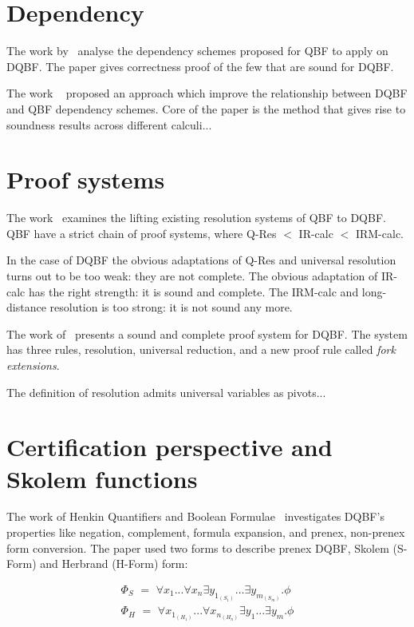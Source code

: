 \documentclass{article}
\begin{document}
\section{Dependency}
The work by~\cite{wimmer2016dependency} analyse the dependency
schemes proposed for QBF to apply on DQBF. 
%
The paper gives correctness proof of the few that are sound for DQBF. 
%

The work ~\cite{beyersdorff2018reinterpreting} proposed an approach which improve the relationship between DQBF and QBF
dependency schemes.
%
Core of the paper is the method that gives rise to soundness results across different calculi... 

\section{Proof systems}
The work~\cite{beyersdorff2016lifting} examines the lifting existing resolution systems of QBF to DQBF.
%
QBF have a strict chain of proof systems, where Q-Res $<$ IR-calc $<$ IRM-calc.
%

In the case of DQBF the obvious adaptations of Q-Res and universal resolution turns out to be too weak: they are not complete. 
%
The obvious adaptation of IR-calc has
the right strength: it is sound and complete. 
%
The IRM-calc and long-distance resolution is too strong: it is not sound any more.

The work of~\cite{rabe2017resolution} presents a sound and complete proof system for DQBF.
%
The system has three rules, resolution, universal reduction, and a new proof rule called \textit{fork extensions}.

The definition of resolution admits universal variables as pivots...

\section{Certification perspective and Skolem functions}

The work of Henkin Quantifiers and Boolean Formulae~\cite{balabanov2012henkin} investigates DQBF's properties like negation, complement, formula expansion, and prenex, non-prenex form conversion. 
%
The paper used two forms to describe prenex DQBF, Skolem (S-Form) and Herbrand (H-Form) form:

\begin{align}
	\Phi_{S} \,\, = \,\, \forall x_{1}... \forall x_{n} \exists y_{1_{(S_{1})}}...\exists y_{m_{(S_{m})}} . \phi \label{eq1}\\
	\Phi_{H}  \,\, = \,\, \forall x_{1_{(H_{1})}}... \forall x_{n_{(H_{n})}} \exists y_{1}...\exists y_{m} . \phi \label{eq2}
\end{align}
\end{document}
